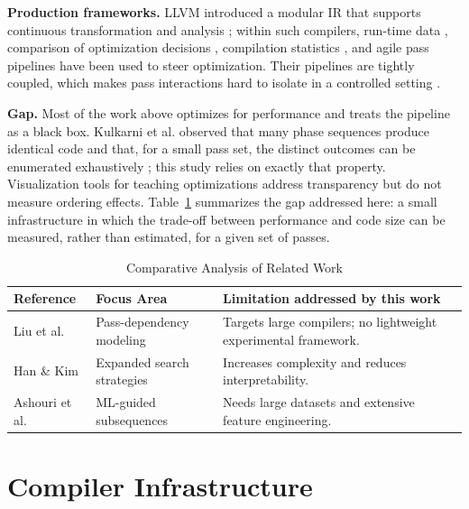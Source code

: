 \documentclass[conference]{IEEEtran}
\begin{document}
\textbf{Production frameworks.} LLVM introduced a modular IR that supports continuous transformation and analysis \cite{ref16}; within such compilers, run-time data \cite{ref23}, comparison of optimization decisions \cite{ref24}, compilation statistics \cite{ref7}, and agile pass pipelines \cite{ref27} have been used to steer optimization. Their pipelines are tightly coupled, which makes pass interactions hard to isolate in a controlled setting \cite{ref16}.

\textbf{Gap.} Most of the work above optimizes for performance and treats the pipeline as a black box. Kulkarni et al. observed that many phase sequences produce identical code and that, for a small pass set, the distinct outcomes can be enumerated exhaustively \cite{ref19}; this study relies on exactly that property. Visualization tools for teaching optimizations \cite{ref30} address transparency but do not measure ordering effects. Table~\ref{tab:lit_review} summarizes the gap addressed here: a small infrastructure in which the trade-off between performance and code size can be measured, rather than estimated, for a given set of passes.

\begin{table}[htbp]
\caption{Comparative Analysis of Related Work}
\label{tab:lit_review}
\centering
\renewcommand{\arraystretch}{1.1}
{\small
\begin{tabularx}{\columnwidth}{@{}p{} p{} X@{}}
\toprule
\textbf{Reference} & \textbf{Focus Area} & \textbf{Limitation addressed by this work} \\
\midrule
Liu et al. \cite{ref1} & Pass-dependency modeling & Targets large compilers; no lightweight experimental framework. \\
Han \& Kim \cite{ref2} & Expanded search strategies & Increases complexity and reduces interpretability. \\
Ashouri et al. \cite{ref15} & ML-guided subsequences & Needs large datasets and extensive feature engineering. \\
\bottomrule
\end{tabularx}
}
\end{table}

\section{Compiler Infrastructure}
\end{document}
